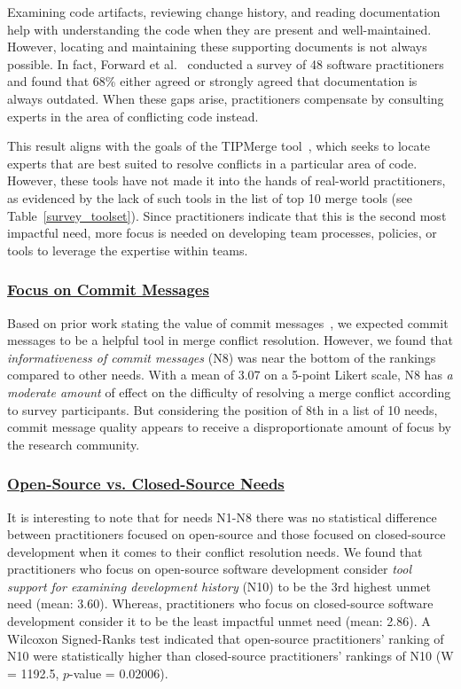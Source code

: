 Examining code artifacts, reviewing change history, and reading documentation help with understanding the code when they are present and well-maintained.
However, locating and maintaining these supporting documents is not always possible.
In fact, Forward et al.~\cite{forward2002documentation} conducted a survey of 48 software practitioners and found that 68\% either agreed or strongly agreed that documentation is always outdated.
When these gaps arise, practitioners compensate by consulting experts in the area of conflicting code instead.

This result aligns with the goals of the TIPMerge tool~\cite{CostaSarma}, which seeks to locate experts that are best suited to resolve conflicts in a particular area of code.
However, these tools have not made it into the hands of real-world practitioners, as evidenced by the lack of such tools in the list of top 10 merge tools (see Table~\ref{survey_toolset}).
Since practitioners indicate that this is the second most impactful need, more focus is needed on developing team processes, policies, or tools to leverage the expertise within teams.

\subsubsection{\underline{Focus on Commit Messages}}
Based on prior work stating the value of commit messages~\cite{yamauchi2014clustering, hindle2009automatic, cortes2014automatically, hattori2008nature}, we expected commit messages to be a helpful tool in merge conflict resolution.
However, we found that \textit{informativeness of commit messages} (N8) was near the bottom of the rankings compared to other needs.
With a mean of 3.07 on a 5-point Likert scale, N8 has \textit{a moderate amount} of effect on the difficulty of resolving a merge conflict according to survey participants.
But considering the position of 8th in a list of 10 needs, commit message quality appears to receive a disproportionate amount of focus by the research community.

\subsubsection{\underline{Open-Source vs. Closed-Source Needs}}
\label{oss_vs_closed_tool_support} 
It is interesting to note that for needs N1-N8 there was no statistical difference between practitioners focused on open-source and those focused on closed-source development when it comes to their conflict resolution needs.
We found that practitioners who focus on open-source software development consider \textit{tool support for examining development history} (N10) to be the 3rd highest unmet need (mean: 3.60).
Whereas, practitioners who focus on closed-source software development consider it to be the least impactful unmet need (mean: 2.86).
A Wilcoxon Signed-Ranks test indicated that open-source practitioners' ranking of N10 were statistically higher than closed-source practitioners' rankings of N10 (W = 1192.5, $p$-value = 0.02006).

